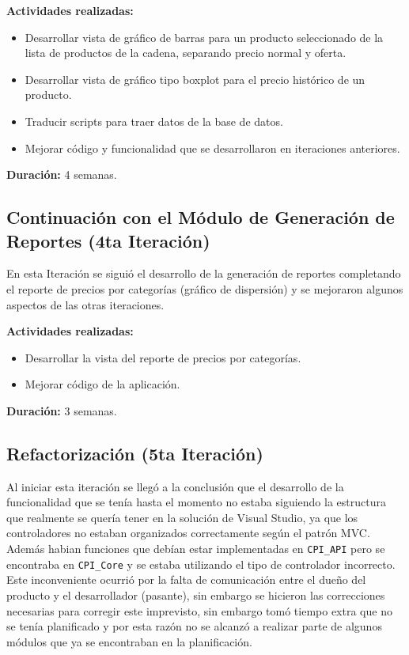 \textbf{Actividades realizadas:}
\begin{itemize}
   \item Desarrollar vista de gráfico de barras para un producto seleccionado de la lista de productos de la cadena, separando precio normal y oferta.
   \item Desarrollar vista de gráfico tipo boxplot para el precio histórico de un producto.
   \item Traducir scripts para traer datos de la base de datos.
   \item Mejorar código y funcionalidad que se desarrollaron en iteraciones anteriores.
\end{itemize}


\textbf{Duración:} 4 semanas.

\subsection{Continuación con el Módulo de Generación de Reportes (4ta Iteración)}
En esta Iteración se siguió el desarrollo de la generación de reportes completando el reporte de precios por categorías (gráfico de dispersión) y se mejoraron algunos aspectos de las otras iteraciones.

\textbf{Actividades realizadas:}
\begin{itemize}
   \item Desarrollar la vista del reporte de precios por categorías.
   \item Mejorar código de la aplicación.
\end{itemize}

\textbf{Duración:} 3 semanas.


\subsection{Refactorización (5ta Iteración)}
Al iniciar esta iteración se llegó a la conclusión que el desarrollo de la funcionalidad que se tenía hasta el momento no estaba siguiendo la estructura que realmente se quería tener en la solución de Visual Studio, ya que los controladores no estaban organizados correctamente según el patrón MVC. Además habian funciones que debían estar implementadas en \verb|CPI_API| pero se encontraba en \verb|CPI_Core| y se estaba utilizando el tipo de controlador incorrecto. Este inconveniente ocurrió por la falta de comunicación entre el dueño del producto y el desarrollador (pasante), sin embargo se hicieron las correcciones necesarias para corregir este imprevisto, sin embargo tomó tiempo extra que no se tenía planificado y por esta razón no se alcanzó a realizar parte de algunos módulos que ya se encontraban en la planificación.


